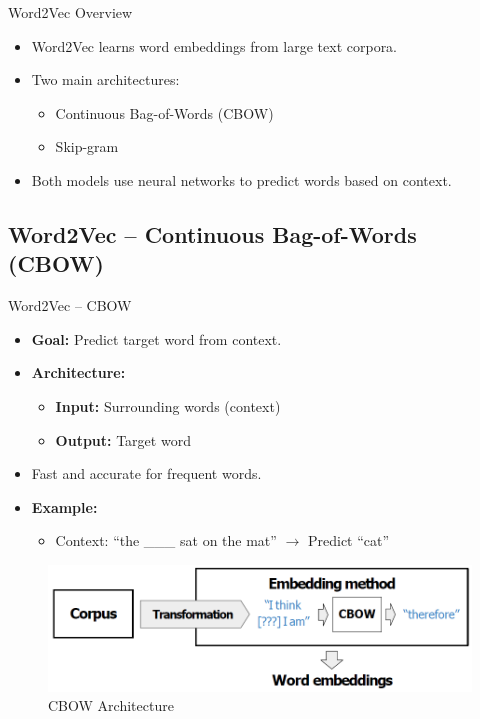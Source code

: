 \begin{frame}{Word2Vec Overview}
    \begin{itemize}
        \item Word2Vec learns word embeddings from large text corpora.
        \item Two main architectures:
        \begin{itemize}
            \item Continuous Bag-of-Words (CBOW)
            \item Skip-gram
        \end{itemize}
        \item Both models use neural networks to predict words based on context.
    \end{itemize}
\end{frame}

\subsection{Word2Vec – Continuous Bag-of-Words (CBOW)}
\begin{frame}[allowframebreaks]{Word2Vec – CBOW}
    \begin{itemize}
        \item \textbf{Goal:} Predict target word from context.
        \item \textbf{Architecture:}
        \begin{itemize}
            \item \textbf{Input:} Surrounding words (context)
            \item \textbf{Output:} Target word
        \end{itemize}
        \item Fast and accurate for frequent words.
        \item \textbf{Example:}
        \begin{itemize}
            \item Context: ``the \_\_\_ sat on the mat'' $\rightarrow$ Predict ``cat''
        \end{itemize}
    \end{itemize}
\framebreak
    \begin{figure}
        \centering
        \includegraphics[width=\textwidth,height=0.8\textheight,keepaspectratio]{images/vector-space/cbow-1.png}
        \caption{CBOW Architecture}
    \end{figure}
\end{frame}

